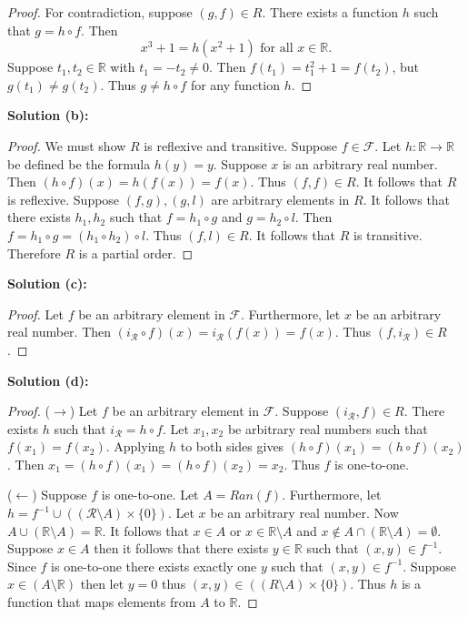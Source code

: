 \begin{proof}
    For contradiction, suppose $(g, f) \in R$.  
    There exists a function $h$ such that $g = h \circ f$. Then
    \[
    x^3 + 1 = h(x^2 + 1) \text{ for all } x \in \mathbb{R}.
    \]  
    Suppose $t_1, t_2 \in \mathbb{R}$ with $t_1 = -t_2 \ne 0$.  
    Then $f(t_1) = t_1^2 + 1 = f(t_2)$, but $g(t_1) \ne g(t_2)$.  
    Thus $g \ne h \circ f$ for any function $h$.
\end{proof}

\textbf{Solution (b):}

\begin{proof}
    We must show $R$ is reflexive and transitive.
    Suppose $f \in \mathcal{F}$.
    Let $h : \mathbb{R} \rightarrow \mathbb{R}$ be defined be the formula $h(y) = y$.
    Suppose $x$ is an arbitrary real number.
    Then $(h \circ f)(x) = h(f(x)) = f(x)$.
    Thus $(f, f) \in R$.
    It follows that $R$ is reflexive.
    Suppose $(f, g), (g, l)$ are arbitrary elements in $R$.
    It follows that there exists $h_1, h_2$ such that 
        $f = h_1 \circ g$ and $g = h_2 \circ l$.
    Then $f = h_1 \circ g = (h_1 \circ h_2) \circ l$.
    Thus $(f, l) \in R$.
    It follows that $R$ is transitive.
    Therefore $R$ is a partial order.
\end{proof}

\textbf{Solution (c):}

\begin{proof}
    Let $f$ be an arbitrary element in $\mathcal{F}$.
    Furthermore, let $x$ be an arbitrary real number.
    Then $(i_{\mathcal{R}} \circ f)(x) = i_{\mathcal{R}}(f(x)) = f(x)$.
    Thus $(f, i_{\mathcal{R}}) \in R$.
\end{proof}

\textbf{Solution (d):}

\begin{proof}
    ($\rightarrow$) Let $f$ be an arbitrary element in $\mathcal{F}$.
    Suppose $(i_{\mathcal{R}}, f) \in R$.
    There exists $h$ such that $i_{\mathcal{R}} = h \circ f$.
    Let $x_1, x_2$ be arbitrary real numbers such that 
        $f(x_1) = f(x_2)$.
    Applying $h$ to both sides gives 
        $(h \circ f)(x_1) = (h \circ f)(x_2)$.
    Then $x_1 = (h \circ f)(x_1) = (h \circ f)(x_2) = x_2$.
    Thus $f$ is one-to-one.

    ($\leftarrow$) Suppose $f$ is one-to-one.
    Let $A = Ran(f)$.
    Furthermore, let $h = f^{-1} \cup ((\mathcal{R} \setminus A) \times \{0\})$.
    Let $x$ be an arbitrary real number.
    Now $A \cup (\mathbb{R} \setminus A) = \mathbb{R}$.
    It follows that $x \in A$ or $x \in \mathbb{R} \setminus A$
        and $x \notin A \cap (\mathbb{R} \setminus A) = \emptyset$.
    Suppose $x \in A$ then it follows that there exists $y \in \mathbb{R}$
        such that $(x, y) \in f^{-1}$.
    Since $f$ is one-to-one there exists exactly one $y$
        such that $(x, y) \in f^{-1}$.
    Suppose $x \in (A \setminus \mathbb{R})$ then let $y = 0$
        thus $(x, y) \in ((R \setminus A) \times \{0\})$.
    Thus $h$ is a function that maps elements from $A$ to $\mathbb{R}$.
\end{proof}

